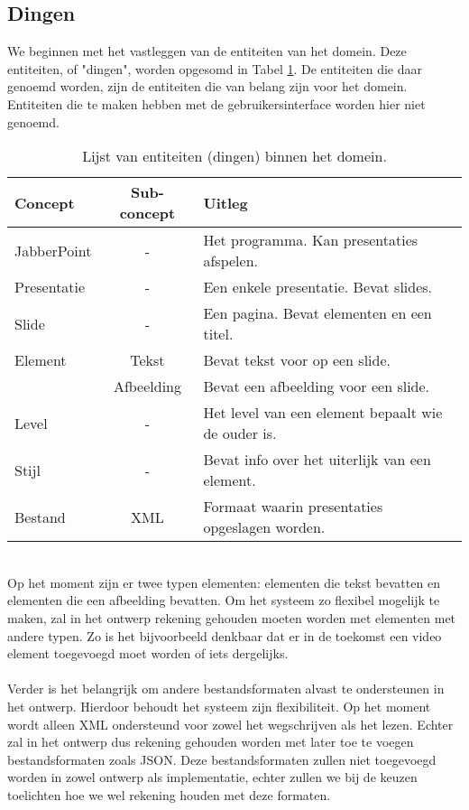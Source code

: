 \documentclass[a4paper]{article}
\newcommand{\1}[0]{\'{e}\'{e}n}
\begin{document}
\subsection{Dingen}
We beginnen met het vastleggen van de entiteiten van het domein. Deze entiteiten, of "dingen", worden opgesomd in Tabel \ref{table:dingen}. De entiteiten die daar genoemd worden, zijn de entiteiten die van belang zijn voor het domein. Entiteiten die te maken hebben met de gebruikersinterface worden hier niet genoemd.
\begin{table}[!h]
\centering
	\begin{tabular}{lcl}
	\toprule
 	Concept & Sub-concept & Uitleg \\ \midrule
 	JabberPoint & - & Het programma. Kan presentaties afspelen.\\
 	Presentatie & - & Een enkele presentatie. Bevat slides.\\
 	Slide & - & Een pagina. Bevat elementen en een titel.\\
 	Element & Tekst & Bevat tekst voor op een slide.\\
 	 & Afbeelding & Bevat een afbeelding voor een slide.\\
 	Level & - & Het level van een element bepaalt wie de ouder is.\\
 	Stijl & - & Bevat info over het uiterlijk van een element.\\
 	Bestand & XML & Formaat waarin presentaties opgeslagen worden.\\
 	\bottomrule
	\end{tabular}
\caption{Lijst van entiteiten (dingen) binnen het domein.}
\label{table:dingen}
\end{table}
\\
Op het moment zijn er twee typen elementen: elementen die tekst bevatten en elementen die een afbeelding bevatten. Om het systeem zo flexibel mogelijk te maken, zal in het ontwerp rekening gehouden moeten worden met elementen met andere typen. Zo is het bijvoorbeeld denkbaar dat er in de toekomst een video element toegevoegd moet worden of iets dergelijks.
\\\\
Verder is het belangrijk om andere bestandsformaten alvast te ondersteunen in het ontwerp. Hierdoor behoudt het systeem zijn flexibiliteit. Op het moment wordt alleen XML ondersteund voor zowel het wegschrijven als het lezen. Echter zal in het ontwerp dus rekening gehouden worden met later toe te voegen bestandsformaten zoals JSON. Deze bestandsformaten zullen niet toegevoegd worden in zowel ontwerp als implementatie, echter zullen we bij de keuzen toelichten hoe we wel rekening houden met deze formaten.
\end{document}
